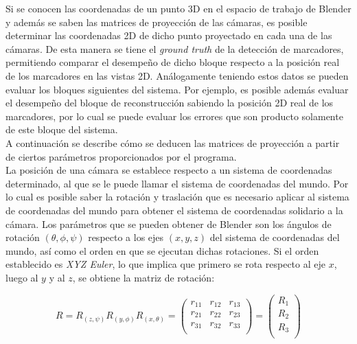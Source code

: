 Si se conocen las coordenadas de un punto 3D en el espacio de trabajo de Blender y además se saben las matrices de proyección de las cámaras, es posible determinar las coordenadas 2D de dicho punto proyectado en cada una de las cámaras. De esta manera se tiene el \textit{ground truth} de la detección de marcadores, permitiendo comparar el desempeño de dicho bloque respecto  a la posición real de los marcadores en las vistas 2D. Análogamente teniendo estos datos se pueden evaluar los bloques siguientes del sistema. Por ejemplo, es posible además evaluar el desempeño del bloque de reconstrucción sabiendo la posición 2D real de los marcadores, por lo cual se puede evaluar los errores que son producto solamente de este bloque del sistema.\\

A continuación se describe cómo se deducen las matrices de proyección a partir de ciertos parámetros proporcionados por el programa.\\

La posición de una cámara se establece respecto a un sistema de coordenadas determinado, al que se le puede llamar el sistema de coordenadas del mundo. Por lo cual es posible saber la rotación y traslación que es necesario aplicar al sistema de coordenadas del mundo para obtener el sistema de coordenadas solidario a la cámara. Los parámetros que se pueden obtener de Blender son los ángulos de rotación $(\theta, \phi, \psi )$ respecto a los ejes $(x,y, z)$ del sistema de coordenadas del mundo, así como el orden en que se ejecutan dichas rotaciones. Si el orden establecido es \textit{XYZ Euler}, lo que implica que primero se rota respecto al eje $x$, luego al $y$ y al $z$, se obtiene la matriz de rotación:

\[R=R_{(z,\psi)}R_{(y,\phi)}R_{(x,\theta)}
= \begin{pmatrix}
		r_{11} & r_{12} & r_{13}\\
		r_{21} & r_{22} & r_{23}\\
		r_{31} & r_{32} & r_{33}\\ 
\end{pmatrix}= 
\begin{pmatrix}
			R_1 \\
			R_2 \\
			R_3 \\
		\end{pmatrix}
\]
 

